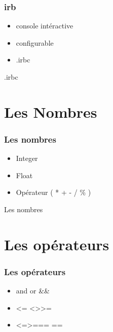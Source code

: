 \documentclass{beamer}
\begin{document}
\begin{frame}
  \frametitle{irb}
  \begin{itemize}
    \item console intéractive
    \item configurable
    \item .irbc
  \end{itemize}
\end{frame}

\begin{frame}
  \begin{beamerboxesrounded}{.irbc}
    
  \end{beamerboxesrounded}
\end{frame}

\section{Les Nombres}

\begin{frame}
  \frametitle{Les nombres}
  \begin{itemize}
    \item Integer
    \item Float
    \item Op\'erateur ( * + - / \% )
  \end{itemize}
\end{frame}

\begin{frame}
  \begin{beamerboxesrounded}{Les nombres}
    
  \end{beamerboxesrounded}
\end{frame}

\section{Les opérateurs}

\begin{frame}
  \frametitle{Les op\'erateurs}
  \begin{itemize}
    \item and or \&\& \textbar\textbar
    \item \textless= \textless \textgreater \textgreater=
    \item \textless=\textgreater === ==
  \end{itemize}
\end{frame}
\end{document}

